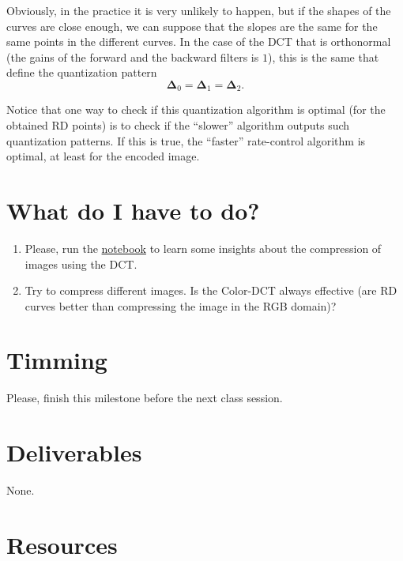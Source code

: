 Obviously, in the practice it is very unlikely to happen, but if the
shapes of the curves are close enough, we can suppose that the slopes
are the same for the same points in the different curves. In the case
of the DCT that is orthonormal (the gains of the forward and the
backward filters is $1$), this is the same that define the
quantization pattern
\begin{equation}
  \mathbf{\Delta}_0 = \mathbf{\Delta}_1 = \mathbf{\Delta}_2.
\end{equation}

Notice that one way to check if this quantization algorithm is optimal
(for the obtained RD points) is to check if the ``slower'' algorithm
outputs such quantization patterns. If this is true, the ``faster''
rate-control algorithm is optimal, at least for the encoded image.


\section{What do I have to do?}

\begin{enumerate}
\item Please, run the
  \href{https://github.com/Sistemas-Multimedia/Sistemas-Multimedia.github.io/blob/master/contents/color_DCT/RGB_DCT.ipynb}{notebook}
  to learn some insights about the compression of images using the
  DCT.
\item Try to compress different images. Is the Color-DCT always
  effective (are RD curves better than compressing the image in
  the RGB domain)?
\end{enumerate}

\section{Timming}

Please, finish this milestone before the next class session.

\section{Deliverables}

None.

\section{Resources}

\renewcommand{\addcontentsline}[3]{}%

